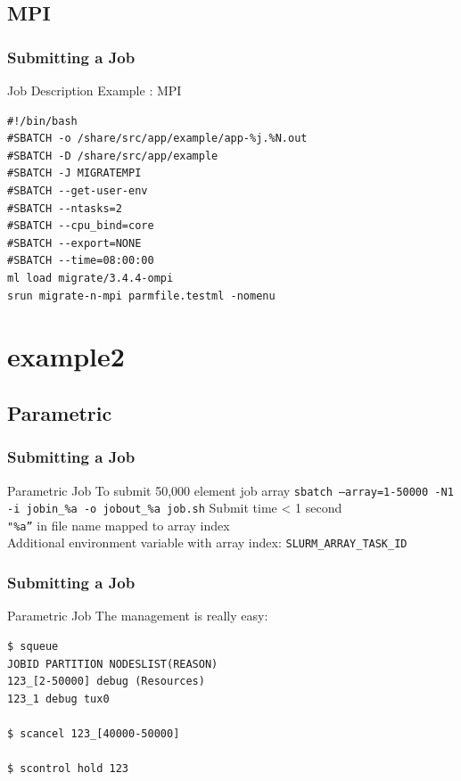 \documentclass{beamer}
\begin{document}
\subsection{MPI}
\begin{frame}[fragile]
  \frametitle{Submitting a Job}
     \begin{block}{Job Description Example : MPI}
\begin{small}
\begin{verbatim}
#!/bin/bash
#SBATCH -o /share/src/app/example/app-%j.%N.out
#SBATCH -D /share/src/app/example
#SBATCH -J MIGRATEMPI
#SBATCH --get-user-env
#SBATCH --ntasks=2
#SBATCH --cpu_bind=core
#SBATCH --export=NONE
#SBATCH --time=08:00:00
ml load migrate/3.4.4-ompi
srun migrate-n-mpi parmfile.testml -nomenu
\end{verbatim}
\end{small}
  \end{block}
\end{frame}

\section{example2}
\subsection{Parametric}
\begin{frame}[fragile]
  \frametitle{Submitting a Job}
   \begin{block}{Parametric Job}
To submit 50,000 element job array
\verb|sbatch –array=1-50000 -N1 -i jobin_%a -o jobout_%a job.sh|
Submit time < 1 second\\
\verb|"%a”| in file name mapped to array index\\
Additional environment variable with array index: \verb|SLURM_ARRAY_TASK_ID|\\
 \end{block}
\end{frame}

\begin{frame}[fragile]
  \frametitle{Submitting a Job}
   \begin{block}{Parametric Job}
The management is really easy:
\begin{verbatim}
$ squeue
JOBID PARTITION NODESLIST(REASON) 
123_[2-50000] debug (Resources)
123_1 debug tux0

$ scancel 123_[40000-50000] 

$ scontrol hold 123
\end{verbatim}
 \end{block}
\end{frame}
\end{document}
